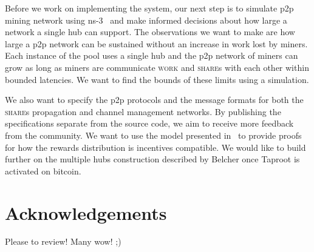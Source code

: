 \documentclass{article}
\begin{document}
Before we work on implementing the system, our next step is to
simulate p2p mining network using ns-3~\cite{ns3} and make informed
decisions about how large a network a single hub can support. The
observations we want to make are how large a p2p network can be
sustained without an increase in work lost by miners. Each instance of
the pool uses a single hub and the p2p network of miners can grow as
long as miners are communicate \textsc{work} and \textsc{share}s with
each other within bounded latencies. We want to find the bounds of
these limits using a simulation.

We also want to specify the p2p protocols and the message formats for
both the \textsc{share}s propagation and channel management
networks. By publishing the specifications separate from the source
code, we aim to receive more feedback from the community. We want to
use the model presented in~\cite{incentives-compatible} to provide
proofs for how the rewards distribution is incentives compatible. We
would like to build further on the multiple hubs construction
described by Belcher once Taproot is activated on bitcoin.

\section{Acknowledgements}

Please to review! Many wow! ;)

 

\end{document}
